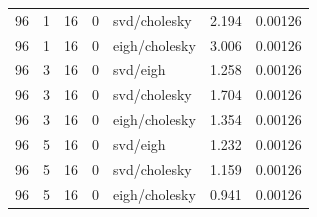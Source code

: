 \begin{tabular}{rrrrlrr}
96 & 1 & 16 & 0 & svd/cholesky & 2.194 & 0.00126 \\
96 & 1 & 16 & 0 & eigh/cholesky & 3.006 & 0.00126 \\
96 & 3 & 16 & 0 & svd/eigh & 1.258 & 0.00126 \\
96 & 3 & 16 & 0 & svd/cholesky & 1.704 & 0.00126 \\
96 & 3 & 16 & 0 & eigh/cholesky & 1.354 & 0.00126 \\
96 & 5 & 16 & 0 & svd/eigh & 1.232 & 0.00126 \\
96 & 5 & 16 & 0 & svd/cholesky & 1.159 & 0.00126 \\
96 & 5 & 16 & 0 & eigh/cholesky & 0.941 & 0.00126 \\
\hline
\end{tabular}
